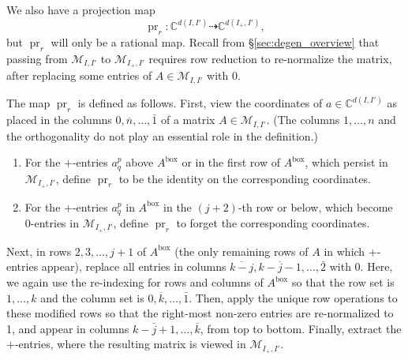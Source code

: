 \documentclass[12pt]{amsart}
\DeclareMathOperator{\inbox}{box}
\DeclareMathOperator{\pr}{pr}
\newcommand{\bC}{\mathbb{C}}
\newcommand{\cM}{\mathcal{M}}
\newcommand{\bark}{\overline{k}}
\newcommand{\barn}{\overline{n}}
\begin{document}
We also have a projection map
\begin{equation*}
    \pr_r:\bC^{d(I,I')}\dashrightarrow \bC^{d(I_+,I')},
\end{equation*}
but $\pr_r$ will only be a rational map. Recall from \S\ref{sec:degen_overview} that passing from $\cM_{I,I'}$ to $\cM_{I_+,I'}$ requires row reduction to re-normalize the matrix, after replacing some entries of $A\in\cM_{I,I'}$ with 0.

The map $\pr_r$ is defined as follows. First, view the coordinates of $a\in \bC^{d(I,I')}$ as placed in the columns $0,\barn,\ldots,\bar1$ of a matrix $A\in \cM_{I,I'}$. (The columns $1,\ldots,n$ and the orthogonality do not play an essential role in the definition.)
\begin{enumerate}
    \item For the $+$-entries $a^p_q$ above $A^{\inbox}$ or in the first row of $A^{\inbox}$, which persist in $\cM_{I_+,I'}$, define $\pr_r$ to be the identity on the corresponding coordinates.
    \item For the $+$-entries $a^p_q$ in $A^{\inbox}$ in the $(j+2)$-th row or below, which become 0-entries in $\cM_{I_+,I'}$, define $\pr_r$ to forget the corresponding coordinates.
\end{enumerate}
Next, in rows $2,3,\ldots,j+1$ of $A^{\inbox}$ (the only remaining rows of $A$ in which $+$-entries appear), replace all entries in columns $\overline{k-j},\overline{k-j-1},\ldots,\bar2$ with 0. Here, we again use the re-indexing for rows and columns of $A^{\inbox}$ so that the row set is $1,\ldots,k$ and the column set is $0,\bark,\ldots,\bar1$. Then, apply the unique row operations to these modified rows so that the right-most non-zero entries are re-normalized to 1, and appear in columns $\overline{k-j+1},\ldots,\bark$, from top to bottom. Finally, extract the $+$-entries, where the resulting matrix is viewed in $\cM_{I_+,I'}$.
\end{document}
